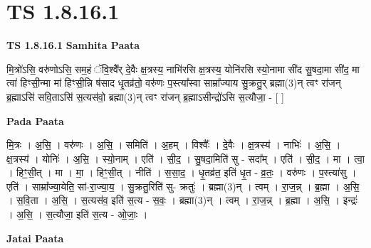 \documentclass[17pt]{extarticle}
\begin{document}
\section*{ TS 1.8.16.1 }

\textbf{TS 1.8.16.1 } \newline
\textbf{Samhita Paata} \newline

मि॒त्रो॑ऽसि॒ वरु॑णोऽसि॒ सम॒हं ॅवि॒श्वै᳚र् दे॒वैः क्ष॒त्रस्य॒ नाभि॑रसि क्ष॒त्रस्य॒ योनि॑रसि स्यो॒नामा सी॑द सु॒षदा॒मा सी॑द॒ मा त्वा॑ हिꣳसी॒न्मा मा॑ हिꣳसी॒न्नि ष॑साद धृ॒तव्र॑तो॒ वरु॑णः प॒स्त्या᳚स्वा साम्रा᳚ज्याय सु॒क्रतु॒र् ब्रह्मा(3)न् त्वꣳ रा॑जन् ब्र॒ह्माऽसि॑ सवि॒ताऽसि॑ स॒त्यस॑वो॒ ब्रह्मा(3)न् त्वꣳ रा॑जन् ब्र॒ह्माऽसीन्द्रो॑ऽसि स॒त्यौजा॒ - [ ] \newline

\textbf{Pada Paata} \newline

मि॒त्रः । अ॒सि॒ । वरु॑णः । अ॒सि॒ । समिति॑ । अ॒हम् । विश्वैः᳚ । दे॒वैः । क्ष॒त्रस्य॑ । नाभिः॑ । अ॒सि॒ । क्ष॒त्रस्य॑ । योनिः॑ । अ॒सि॒ । स्यो॒नाम् । एति॑ । सी॒द॒ । सु॒षदा॒मिति॑ सु - सदा᳚म् । एति॑ । सी॒द॒ । मा । त्वा॒ । हिꣳ॒॒सी॒त् । मा । मा॒ । हिꣳ॒॒सी॒त् । नीति॑ । स॒सा॒द॒ । धृ॒तव्र॑त॒ इति॑ धृ॒त - व्र॒तः॒ । वरु॑णः । प॒स्त्या॑सु । एति॑ । साम्रा᳚ज्या॒येति॒ सां-रा॒ज्या॒य॒ । सु॒क्रतु॒रिति॑ सु- क्रतुः॑ । ब्रह्मा(3)न् । त्वम् । रा॒ज॒न्न् । ब्र॒ह्मा । अ॒सि॒ । स॒वि॒ता । अ॒सि॒ । स॒त्यस॑व॒ इति॑ स॒त्य - स॒वः॒ । ब्रह्मा(3)न् । त्वम् । रा॒ज॒न्न् । ब्र॒ह्मा । अ॒सि॒ । इन्द्रः॑ । अ॒सि॒ । स॒त्यौजा॒ इति॑ स॒त्य - ओ॒जाः॒ ।  \newline



\textbf{Jatai Paata} \newline
\end{document}
